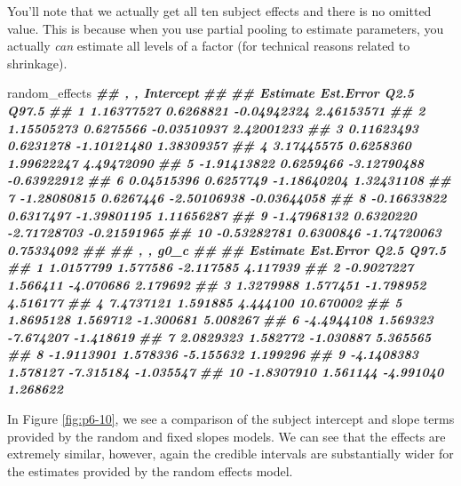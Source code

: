 \documentclass[
]{book}
\newenvironment{Shaded}{\begin{snugshade}}{\end{snugshade}}
\newcommand{\DocumentationTok}[1]{\textcolor[rgb]{0.56,0.35,0.01}{\textbf{\textit{#1}}}}
\newcommand{\NormalTok}[1]{#1}
\begin{document}
You'll note that we actually get all ten subject effects and there is no omitted value. This is because when you use partial pooling to estimate parameters, you actually \emph{can} estimate all levels of a factor (for technical reasons related to shrinkage).

\begin{Shaded}
\begin{Highlighting}[]
\NormalTok{random\_effects}
\DocumentationTok{\#\# , , Intercept}
\DocumentationTok{\#\# }
\DocumentationTok{\#\#       Estimate Est.Error        Q2.5       Q97.5}
\DocumentationTok{\#\# 1   1.16377527 0.6268821 {-}0.04942324  2.46153571}
\DocumentationTok{\#\# 2   1.15505273 0.6275566 {-}0.03510937  2.42001233}
\DocumentationTok{\#\# 3   0.11623493 0.6231278 {-}1.10121480  1.38309357}
\DocumentationTok{\#\# 4   3.17445575 0.6258360  1.99622247  4.49472090}
\DocumentationTok{\#\# 5  {-}1.91413822 0.6259466 {-}3.12790488 {-}0.63922912}
\DocumentationTok{\#\# 6   0.04515396 0.6257749 {-}1.18640204  1.32431108}
\DocumentationTok{\#\# 7  {-}1.28080815 0.6267446 {-}2.50106938 {-}0.03644058}
\DocumentationTok{\#\# 8  {-}0.16633822 0.6317497 {-}1.39801195  1.11656287}
\DocumentationTok{\#\# 9  {-}1.47968132 0.6320220 {-}2.71728703 {-}0.21591965}
\DocumentationTok{\#\# 10 {-}0.53282781 0.6300846 {-}1.74720063  0.75334092}
\DocumentationTok{\#\# }
\DocumentationTok{\#\# , , g0\_c}
\DocumentationTok{\#\# }
\DocumentationTok{\#\#      Estimate Est.Error      Q2.5     Q97.5}
\DocumentationTok{\#\# 1   1.0157799  1.577586 {-}2.117585  4.117939}
\DocumentationTok{\#\# 2  {-}0.9027227  1.566411 {-}4.070686  2.179692}
\DocumentationTok{\#\# 3   1.3279988  1.577451 {-}1.798952  4.516177}
\DocumentationTok{\#\# 4   7.4737121  1.591885  4.444100 10.670002}
\DocumentationTok{\#\# 5   1.8695128  1.569712 {-}1.300681  5.008267}
\DocumentationTok{\#\# 6  {-}4.4944108  1.569323 {-}7.674207 {-}1.418619}
\DocumentationTok{\#\# 7   2.0829323  1.582772 {-}1.030887  5.365565}
\DocumentationTok{\#\# 8  {-}1.9113901  1.578336 {-}5.155632  1.199296}
\DocumentationTok{\#\# 9  {-}4.1408383  1.578127 {-}7.315184 {-}1.035547}
\DocumentationTok{\#\# 10 {-}1.8307910  1.561144 {-}4.991040  1.268622}
\end{Highlighting}
\end{Shaded}

In Figure \ref{fig:p6-10}, we see a comparison of the subject intercept and slope terms provided by the random and fixed slopes models. We can see that the effects are extremely similar, however, again the credible intervals are substantially wider for the estimates provided by the random effects model.
\end{document}
